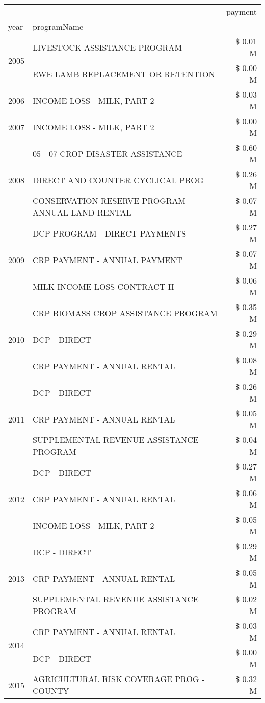 \begin{tabular}{llr}
\toprule
 &  & payment \\
year & programName &  \\
\midrule
\multirow[t]{2}{*}{2005} & LIVESTOCK ASSISTANCE PROGRAM & \$ 0.01 M \\
 & EWE LAMB REPLACEMENT OR RETENTION & \$ 0.00 M \\
\cline{1-3}
2006 & INCOME LOSS - MILK, PART 2 & \$ 0.03 M \\
\cline{1-3}
2007 & INCOME LOSS - MILK, PART 2 & \$ 0.00 M \\
\cline{1-3}
\multirow[t]{3}{*}{2008} & 05 - 07 CROP DISASTER ASSISTANCE & \$ 0.60 M \\
 & DIRECT AND COUNTER CYCLICAL PROG & \$ 0.26 M \\
 & CONSERVATION RESERVE PROGRAM - ANNUAL LAND RENTAL & \$ 0.07 M \\
\cline{1-3}
\multirow[t]{3}{*}{2009} & DCP PROGRAM - DIRECT PAYMENTS & \$ 0.27 M \\
 & CRP PAYMENT - ANNUAL PAYMENT & \$ 0.07 M \\
 & MILK INCOME LOSS CONTRACT II & \$ 0.06 M \\
\cline{1-3}
\multirow[t]{3}{*}{2010} & CRP BIOMASS CROP ASSISTANCE PROGRAM & \$ 0.35 M \\
 & DCP - DIRECT & \$ 0.29 M \\
 & CRP PAYMENT - ANNUAL RENTAL & \$ 0.08 M \\
\cline{1-3}
\multirow[t]{3}{*}{2011} & DCP - DIRECT & \$ 0.26 M \\
 & CRP PAYMENT - ANNUAL RENTAL & \$ 0.05 M \\
 & SUPPLEMENTAL REVENUE ASSISTANCE PROGRAM & \$ 0.04 M \\
\cline{1-3}
\multirow[t]{3}{*}{2012} & DCP - DIRECT & \$ 0.27 M \\
 & CRP PAYMENT - ANNUAL RENTAL & \$ 0.06 M \\
 & INCOME LOSS - MILK, PART 2 & \$ 0.05 M \\
\cline{1-3}
\multirow[t]{3}{*}{2013} & DCP - DIRECT & \$ 0.29 M \\
 & CRP PAYMENT - ANNUAL RENTAL & \$ 0.05 M \\
 & SUPPLEMENTAL REVENUE ASSISTANCE PROGRAM & \$ 0.02 M \\
\cline{1-3}
\multirow[t]{2}{*}{2014} & CRP PAYMENT - ANNUAL RENTAL & \$ 0.03 M \\
 & DCP - DIRECT & \$ 0.00 M \\
\cline{1-3}
\multirow[t]{3}{*}{2015} & AGRICULTURAL RISK COVERAGE PROG - COUNTY & \$ 0.32 M \\

\end{tabular}
